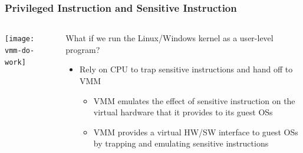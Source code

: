 \begin{frame}
	\frametitle{Privileged Instruction and Sensitive Instruction}

	\begin{columns}
		
		\begin{column}{.35\textwidth}
			
			\texttt{[image: vmm-do-work]}	
			
		\end{column}
		
		\begin{column}{.65\textwidth}
			
			What if we run the Linux/Windows kernel as a user-level program?	
		\begin{itemize}
			\item Rely on CPU to trap sensitive instructions and hand off to VMM
			\begin{itemize}
				\item VMM emulates the effect of sensitive instruction on the virtual hardware that it provides to its guest OSs 
				\item VMM provides a virtual HW/SW interface to guest OSs by trapping and emulating sensitive instructions 
				
			\end{itemize} 
		\end{itemize} 
		\end{column}
		
		
	\end{columns}
	
	
\end{frame}



